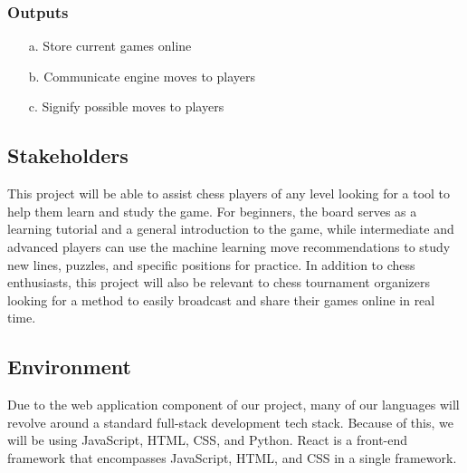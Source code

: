 \documentclass{article}
\begin{document}
\subsubsection{Outputs}
\begin{enumerate}
    \item[a.] Store current games online
    \item[b.] Communicate engine moves to players
    \item[c.] Signify possible moves to players
\end{enumerate}

\subsection{Stakeholders}
{This project will be able to assist chess players of any level looking for a tool to help them learn and study the game. 
For beginners, the board serves as a learning tutorial and a general introduction to the game, while intermediate and advanced players can use the machine learning move recommendations to study new lines, puzzles, and specific positions for practice. 
In addition to chess enthusiasts, this project will also be relevant to chess tournament organizers looking for a method to easily broadcast and share their games online in real time. }

\subsection{Environment}
{Due to the web application component of our project, many of our languages will revolve around a standard full-stack development tech stack. 
Because of this, we will be using JavaScript, HTML, CSS, and Python. React is a front-end framework that encompasses JavaScript, HTML, and CSS in a single framework.}

\medskip
{}

\medskip
{}
\end{document}
